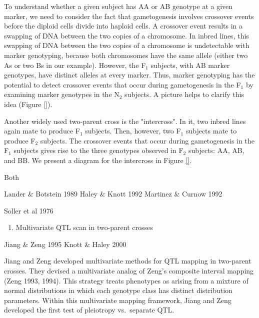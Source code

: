 \documentclass[]{article}
\providecommand{\tightlist}{%
  \setlength{\itemsep}{0pt}\setlength{\parskip}{0pt}}
\begin{document}
To understand whether a given subject has AA or AB genotype at a given marker, we need to consider the fact that gametogenesis involves crossover events before the diploid cells divide into haploid cells. A crossover event results in a swapping of DNA between the two copies of a chromosome. In inbred lines, this swapping of DNA between the two copies of a chromosome is undetectable with marker genotyping, because both chromosomes have the same allele (either two As or two Bs in our example). However, the F$_1$ subjects, with AB marker genotypes, have distinct alleles at every marker. Thus, marker genotyping has the potential to detect crossover events that occur during gametogenesis in the F$_1$ by examining marker genotypes in the N$_2$ subjects. A picture helps to clarify this idea (Figure \ref{}).


Another widely used two-parent cross is the "intercross". In it, two inbred lines again mate to produce F$_1$ subjects. Then, however, two F$_1$ subjects mate to produce F$_2$ subjects. The crossover events that occur during gametogenesis in the F$_1$ subjects gives rise to the three genotypes observed in F$_2$ subjects: AA, AB, and BB. We present a diagram for the intercross in Figure \ref{}.

Both 







Lander \& Botstein 1989 Haley \& Knott 1992 Martinez \& Curnow 1992

Soller et al 1976

\begin{enumerate}
\def\labelenumi{\arabic{enumi}.}
\setcounter{enumi}{2}
\tightlist
\item
  Multivariate QTL scan in two-parent crosses
\end{enumerate}

Jiang \& Zeng 1995 Knott \& Haley 2000

Jiang and Zeng developed multivariate methods for QTL mapping in
two-parent crosses. They devised a multivariate analog of Zeng's
composite interval mapping (Zeng 1993, 1994). This strategy treats
phenotypes as arising from a mixture of normal distributions in which
each genotype class has distinct distribution parameters. Within this
multivariate mapping framework, Jiang and Zeng developed the first test
of pleiotropy vs.~separate QTL.
\end{document}
